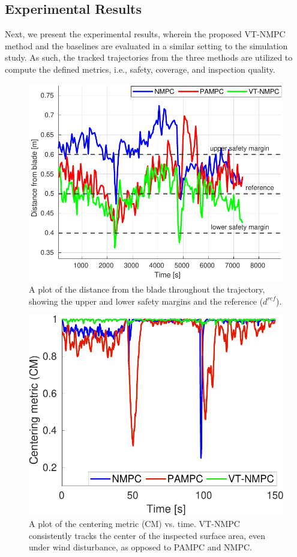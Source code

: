 \documentclass[letterpaper, 10 pt, conference]{ieeeconf}  %
\begin{document}
\subsection{Experimental Results}

Next, we present the experimental results, wherein the proposed VT-NMPC method and the baselines are evaluated in a similar setting to the simulation study. As such, the tracked trajectories from the three methods are utilized to compute the defined metrics, i.e., safety, coverage, and inspection quality. 



\begin{figure}[]
\centering
\includegraphics[width=.45\textwidth]{Autonomous_Robots/figures/distance_real.pdf}
\caption{A plot of the distance from the blade throughout the trajectory, showing the upper and lower safety margins and the reference ($d^{ref}$). }  \label{fig:distance_r}
\end{figure}


\begin{figure}[]
\centering
\includegraphics[width=.45\textwidth]{Autonomous_Robots/figures/cm.pdf}
\caption{A plot of the centering metric (CM) vs. time. VT-NMPC consistently tracks the center of the inspected surface area, even under wind disturbance, as opposed to PAMPC and NMPC.}  \label{fig:cm_r}
\end{figure}
\end{document}
